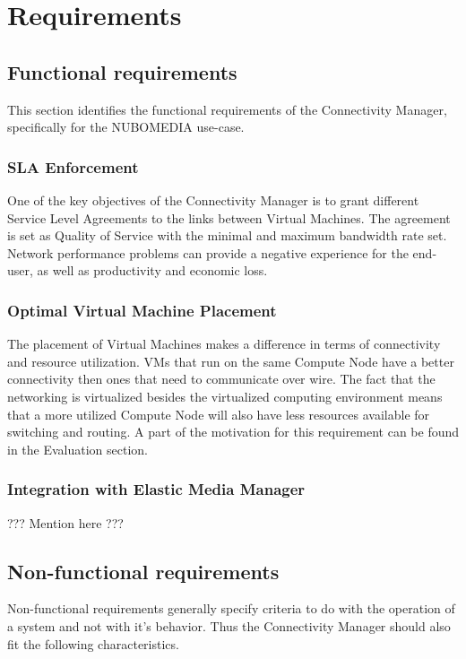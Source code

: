 \chapter{Requirements}

\section{Functional requirements}

This section identifies the functional requirements of the Connectivity Manager, specifically for the NUBOMEDIA use-case.

\subsection{SLA Enforcement}

One of the key objectives of the Connectivity Manager is to grant different Service Level Agreements to the links between Virtual Machines. The agreement is set as Quality of Service with the minimal and maximum bandwidth rate set. Network performance problems can provide a negative experience for the end-user, as well as productivity and economic loss.

\subsection{Optimal Virtual Machine Placement}

The placement of Virtual Machines makes a difference in terms of connectivity and resource utilization. VMs that run on the same Compute Node have a better connectivity then ones that need to communicate over wire. The fact that the networking is virtualized besides the virtualized computing environment means that a more utilized Compute Node will also have less resources available for switching and routing. A part of the motivation for this requirement can be found in the Evaluation section.

\subsection{Integration with Elastic Media Manager}

??? Mention here ???

\section{Non-functional requirements}

Non-functional requirements generally specify criteria to do with the operation of a system and not with it's behavior. Thus the Connectivity Manager should also fit the following characteristics.


